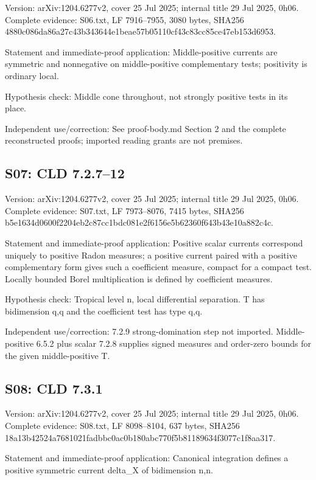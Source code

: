 \documentclass[11pt]{article}
\begin{document}
Version: arXiv:1204.6277v2, cover 25 Jul 2025; internal title 29 Jul 2025, 0h06. Complete evidence: S06.txt, LF 7916--7955, 3080 bytes, SHA256 4880c086da86a27c43b343644e1beae57b05110cf43c83cc85ce47eb153d6953.

Statement and immediate-proof application: Middle-positive currents are symmetric and nonnegative on middle-positive complementary tests; positivity is ordinary local.

Hypothesis check: Middle cone throughout, not strongly positive tests in its place.

Independent use/correction: See proof-body.md Section 2 and the complete reconstructed proofs; imported reading grants are not premises.

\subsection{S07: CLD 7.2.7--12}

Version: arXiv:1204.6277v2, cover 25 Jul 2025; internal title 29 Jul 2025, 0h06. Complete evidence: S07.txt, LF 7973--8076, 7415 bytes, SHA256 b5e1634d0600f2204eb2c87cc1bdc081e2f6156e5b62360f643b43e10a882c4c.

Statement and immediate-proof application: Positive scalar currents correspond uniquely to positive Radon measures; a positive current paired with a positive complementary form gives such a coefficient measure, compact for a compact test. Locally bounded Borel multiplication is defined by coefficient measures.

Hypothesis check: Tropical level n, local differential separation. T has bidimension q,q and the coefficient test has type q,q.

Independent use/correction: 7.2.9 strong-domination step not imported. Middle-positive 6.5.2 plus scalar 7.2.8 supplies signed measures and order-zero bounds for the given middle-positive T.

\subsection{S08: CLD 7.3.1}

Version: arXiv:1204.6277v2, cover 25 Jul 2025; internal title 29 Jul 2025, 0h06. Complete evidence: S08.txt, LF 8098--8104, 637 bytes, SHA256 18a13b42524a7681021fadbbc0ac0b180abc770f5b81189634f3077c1f8aa317.

Statement and immediate-proof application: Canonical integration defines a positive symmetric current delta\_X of bidimension n,n.
\end{document}
